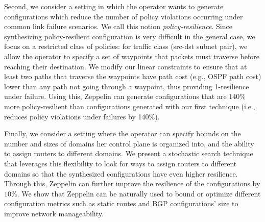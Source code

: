 \documentclass[sigconf]{acmart}
\newcommand{\name}{{\sc Zeppelin}\xspace}
\begin{document}
Second, we consider a setting in which the operator wants to generate
configurations which reduce the number of policy violations occurring
under common link failure scenarios. We call this notion \emph{policy-resilience}.
Since synthesizing policy-resilient configuration is very difficult in
the general case, we focus on a {\rm restricted class} of policies:
for traffic class (src-dst subnet pair), we allow the operator to
specify a set of waypoints that packets must traverse before reaching
their destination.  We modify our linear constraints to ensure that
at least two paths that traverse the waypoints have path cost (e.g.,
OSPF path cost) lower than any path not going through a waypoint, thus
providing 1-resilience under failure. Using this, \name can generate
configurations that are $140\%$ more policy-resilient than
configurations generated with our first technique (i.e., reduces
policy violations under failures by 140\%).

Finally, we consider a setting where the operator can specify bounds
on the number and sizes of domains her control plane is organized
into, and the ability to assign routers to different domains.  We
present a stochastic search technique that leverages this flexibility
to look for ways to assign routers to different domains so that the
synthesized configurations have even higher resilience.  Through this,
\name can further improve the resilience of the configurations by
$10\%$. We show that \name can be naturally used to bound or optimize
different configuration metrics such as static routes and BGP
configurations' size to improve network manageability.
\end{document}
